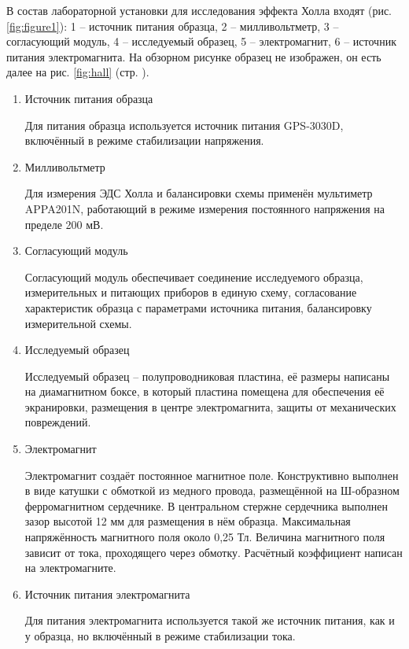 \documentclass[a4paper,14pt]{extarticle}
\begin{document}
В состав лабораторной установки для исследования эффекта Холла входят (рис. \ref{fig:figure1}): 1 – источник питания образца, 2 – милливольтметр, 3 – согласующий модуль, 4 – исследуемый образец, 5 – электромагнит, 6 – источник питания электромагнита. На обзорном рисунке образец не изображен, он есть далее на рис. \ref{fig:hall} (стр. \pageref{fig:hall}).
\begin{enumerate}
\item Источник питания образца

Для питания образца используется источник питания GPS-3030D, включённый в режиме стабилизации напряжения. 

\item Милливольтметр 

Для измерения ЭДС Холла и балансировки схемы применён мультиметр APPA201N, работающий в режиме измерения постоянного напряжения на пределе 200 мВ. 

\item Согласующий модуль

Согласующий модуль обеспечивает соединение исследуемого образца, измерительных и питающих приборов в единую схему, согласование характеристик образца с параметрами источника питания, балансировку измерительной схемы.

\item Исследуемый образец

Исследуемый образец  -- полупроводниковая пластина, её размеры написаны на диамагнитном боксе, в который пластина помещена для обеспечения её экранировки, размещения в центре электромагнита, защиты от механических повреждений.
\item Электромагнит

Электромагнит создаёт постоянное магнитное поле. Конструктивно выполнен в виде катушки с обмоткой из медного провода, размещённой на Ш-образном ферромагнитном сердечнике. В центральном стержне сердечника выполнен зазор высотой 12 мм для размещения в нём образца. Максимальная напряжённость магнитного поля около 0,25 Тл. Величина магнитного поля зависит от тока, проходящего через обмотку. Расчётный коэффициент написан на электромагните.
\item Источник питания электромагнита

Для питания электромагнита используется такой же источник питания, как и у образца, но включённый в режиме стабилизации тока. 
\end{enumerate}
\end{document}
